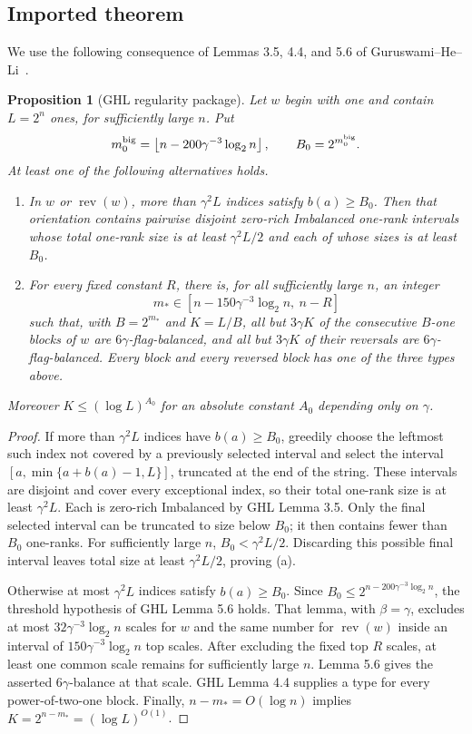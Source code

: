 \documentclass[11pt]{article}
\newtheorem{proposition}[proposition]{Proposition}
\theoremstyle{remark}
\newcommand{\rev}{\operatorname{rev}}
\begin{document}
\subsection{Imported theorem}

We use the following consequence of Lemmas 3.5, 4.4, and 5.6 of
Guruswami--He--Li~\cite{GHL}.

\begin{proposition}[GHL regularity package]\label{prop:GHL}
Let $w$ begin with one and contain $L=2^n$ ones, for sufficiently large $n$.
Put
\[
 m_0^{\rm big}=\left\lfloor n-200\gamma^{-3}\log_2 n\right\rfloor,
 \qquad B_0=2^{m_0^{\rm big}}.
\]
At least one of the following alternatives holds.
\begin{enumerate}[label=(\alph*)]
\item In $w$ or $\rev(w)$, more than $\gamma^2L$ indices satisfy
      $b(a)\ge B_0$.  Then that orientation contains pairwise disjoint
      zero-rich Imbalanced one-rank intervals whose total one-rank size is at
      least $\gamma^2L/2$ and each of whose sizes is at least $B_0$.
\item For every fixed constant $R$, there is, for all sufficiently large
      $n$, an integer
      \[
       m_*\in[n-150\gamma^{-3}\log_2 n,\ n-R]
      \]
      such that, with $B=2^{m_*}$ and $K=L/B$, all but $3\gamma K$ of the
      consecutive $B$-one blocks of $w$ are $6\gamma$-flag-balanced, and
      all but $3\gamma K$ of their reversals are
      $6\gamma$-flag-balanced.  Every block and every reversed block has one
      of the three types above.
\end{enumerate}
Moreover $K\le(\log L)^{A_0}$ for an absolute constant $A_0$ depending only
on $\gamma$.
\end{proposition}

\begin{proof}
If more than $\gamma^2L$ indices have $b(a)\ge B_0$, greedily choose the
leftmost such index not covered by a previously selected interval and select
the interval
$[a,\min\{a+b(a)-1,L\}]$, truncated at the end of the string.  These
intervals are disjoint and cover every exceptional index,
so their total one-rank size is at least $\gamma^2L$.  Each is zero-rich
Imbalanced by GHL Lemma 3.5.  Only the final selected interval can be truncated
to size below $B_0$; it then contains fewer than $B_0$ one-ranks.  For
sufficiently large $n$, $B_0<\gamma^2L/2$.  Discarding this possible final
interval leaves total size at least $\gamma^2L/2$, proving (a).

Otherwise at most $\gamma^2L$ indices satisfy $b(a)\ge B_0$.  Since
$B_0\le 2^{n-200\gamma^{-3}\log_2 n}$, the threshold hypothesis of GHL
Lemma 5.6 holds.  That lemma, with $\beta=\gamma$, excludes at most
$32\gamma^{-3}\log_2 n$ scales for $w$ and the same number for $\rev(w)$
inside an interval of $150\gamma^{-3}\log_2 n$ top scales.  After excluding
the fixed top $R$ scales, at least one common scale remains for sufficiently
large $n$.  Lemma 5.6 gives the asserted $6\gamma$-balance at that scale.
GHL Lemma 4.4 supplies a type for every power-of-two-one block.  Finally,
$n-m_*=O(\log n)$ implies
$K=2^{n-m_*}=(\log L)^{O(1)}$.
\end{proof}
\end{document}
